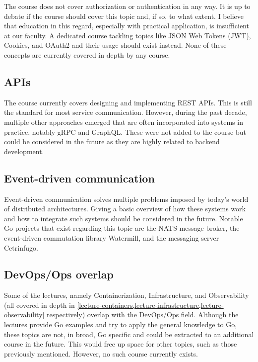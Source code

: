\documentclass[
  digital,
  color,
  oneside,
  nosansbold,
  nocolorbold,
  lof,
  nolot,
]{fithesis4}
\begin{document}
The course does not cover authorization or authentication in any way. It is up to debate if the course should cover this topic and, if so, to what extent. I believe that education in this regard, especially with practical application, is insufficient at our faculty. A dedicated course tackling topics like JSON Web Tokens (JWT)\cite{jwt}, Cookies, and OAuth2\cite{oauth2} and their usage should exist instead. None of these concepts are currently covered in depth by any course.

\subsection{APIs}

The course currently covers designing and implementing REST APIs. This is still the standard for most service communication. However, during the past decade, multiple other approaches emerged that are often incorporated into systems in practice, notably gRPC\cite{grpc} and GraphQL\cite{graphql}. These were not added to the course but could be considered in the future as they are highly related to backend development.

\subsection{Event-driven communication}\label{edc}

Event-driven communication solves multiple problems imposed by today's world of distributed architectures. Giving a basic overview of how these systems work and how to integrate such systems should be considered in the future. Notable Go projects that exist regarding this topic are the NATS\cite{nats} message broker, the event-driven commutation library Watermill\cite{watermill}, and the messaging server Cetrinfugo\cite{centrifugo}.

\subsection{DevOps/Ops overlap}\label{devops-overlap}

Some of the lectures, namely Containerization, Infrastructure, and Observability (all covered in depth in \cref{lecture-containers,lecture-infrastructure,lecture-observability} respectively) overlap with the DevOps/Ops field. Although the lectures provide Go examples and try to apply the general knowledge to Go, these topics are not, in broad, Go specific and could be extracted to an additional course in the future. This would free up space for other topics, such as those previously mentioned. However, no such course currently exists.
\end{document}
